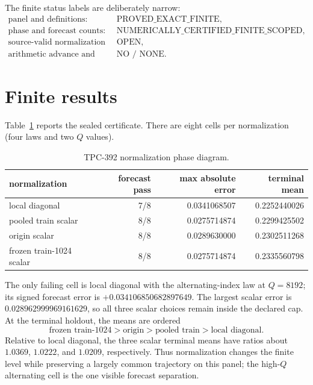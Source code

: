 \documentclass[10pt]{article}
\begin{document}
The finite status labels are deliberately narrow:
\[
\begin{array}{ll}
\text{panel and definitions:}&\text{PROVED\_EXACT\_FINITE},\\
\text{phase and forecast counts:}&\text{NUMERICALLY\_CERTIFIED\_FINITE\_SCOPED},\\
\text{source-valid normalization and growing bounds:}&\text{OPEN},\\
\text{arithmetic advance and twin-prime result:}&\text{NO / NONE}.
\end{array}
\]

\section{Finite results}

Table~\ref{tab:phase} reports the sealed certificate.  There are eight cells
per normalization (four laws and two $Q$ values).

\begin{table}[t]
\centering
\caption{TPC-392 normalization phase diagram.}
\label{tab:phase}
\small
\begin{tabular}{@{}l r r r@{}}
\toprule
normalization & forecast pass & max absolute error & terminal mean\\
\midrule
local diagonal & 7/8 & 0.0341068507 & 0.2252440026\\
pooled train scalar & 8/8 & 0.0275714874 & 0.2299425502\\
origin scalar & 8/8 & 0.0289630000 & 0.2302511268\\
frozen train-1024 scalar & 8/8 & 0.0275714874 & 0.2335560798\\
\bottomrule
\end{tabular}
\end{table}

The only failing cell is local diagonal with the alternating-index law at
$Q=8192$; its signed forecast error is $+0.034106850682897649$.  The largest
scalar error is $0.028962999969161629$, so all three scalar choices remain
inside the declared cap.  At the terminal holdout, the means are ordered
\[
 \text{frozen train-1024} > \text{origin} > \text{pooled train} >
 \text{local diagonal}.
\]
Relative to local diagonal, the three scalar terminal means have ratios about
$1.0369$, $1.0222$, and $1.0209$, respectively.  Thus normalization changes
the finite level while preserving a largely common trajectory on this panel;
the high-$Q$ alternating cell is the one visible forecast separation.
\end{document}
